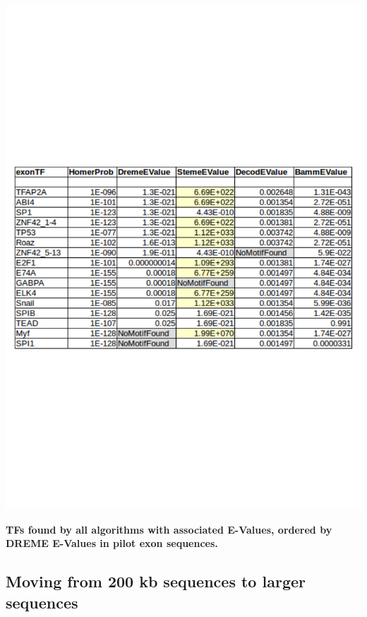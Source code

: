 \documentclass[12pt, onecolumn, oneside]{gsajnl}
\begin{document}
\begin{table}[!h]
    \centering
     \includegraphics[width= \textwidth]{plots/exon_common.pdf} 
    \caption{{\bf TFs found by all algorithms with associated E-Values, ordered by DREME E-Values in pilot exon sequences.}}
    \label{fig: motif_tf_summary_exons}
\end{table}

\clearpage
\subsection{Moving from 200 kb sequences to larger sequences}
\end{document}
